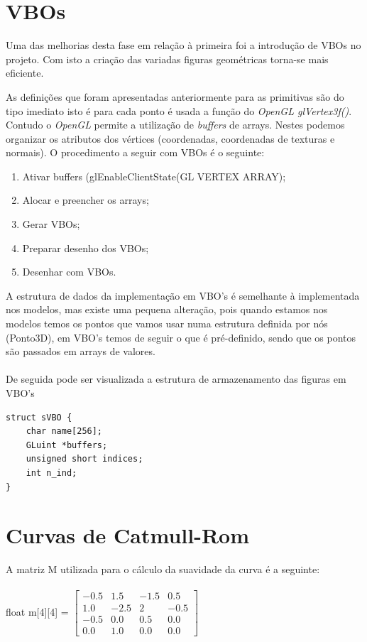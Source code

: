 \chapter{VBOs}
Uma das melhorias desta fase em relação à primeira foi a introdução de VBOs no projeto. Com isto a criação das variadas figuras geométricas torna-se mais eficiente.

As definições que foram apresentadas anteriormente para as primitivas são do tipo imediato isto é para cada ponto é usada a função do \textit{OpenGL glVertex3f()}. Contudo o \textit{OpenGL} permite a utilização de \textit{buffers} de arrays. Nestes podemos organizar os atributos dos vértices (coordenadas, coordenadas de texturas e normais). O procedimento a seguir com VBOs é o seguinte:

\begin{enumerate}
	\item Ativar buffers (glEnableClientState(GL VERTEX ARRAY);
	\item  Alocar e preencher os arrays;
	\item  Gerar VBOs;
	\item Preparar desenho dos VBOs;
	\item Desenhar com VBOs.
\end{enumerate}

A estrutura de dados da implementação em VBO’s é semelhante à implementada nos modelos, mas existe uma pequena alteração, pois quando estamos nos modelos temos os pontos que vamos usar numa estrutura definida por nós (Ponto3D), em VBO’s temos de seguir o que é pré-definido, sendo que os pontos são passados em arrays de valores. \\
\\
De seguida pode ser visualizada a estrutura de armazenamento das figuras em VBO's
\begin{verbatim}
struct sVBO {
	char name[256];
	GLuint *buffers;
	unsigned short indices;
	int n_ind;
}
\end{verbatim}


\chapter{Curvas de Catmull-Rom}

A matriz M utilizada para o cálculo da suavidade da curva é a seguinte: \\
\\
float m[4][4] = $\left[ \begin{array}{cccc}
-0.5 & 1.5  & -1.5 & 0.5 \\ 
1.0 & -2.5 & 2 & -0.5\\
-0.5 & 0.0  & 0.5 &0.0\\
0.0 & 1.0 & 0.0 & 0.0
\end{array} \right]$
\\ 
